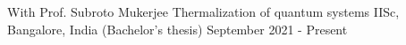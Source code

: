 

\begin{cventries}


\cventry
{With Prof. Subroto Mukerjee} %
{Thermalization of quantum systems} %
{IISc, Bangalore, India \space \space\space\space\space\space\space\space\space\space\space(Bachelor's thesis)} %
{September 2021 - Present} %
{
	\begin{cvitems} %
	\end{cvitems}
}

\end{cventries}
